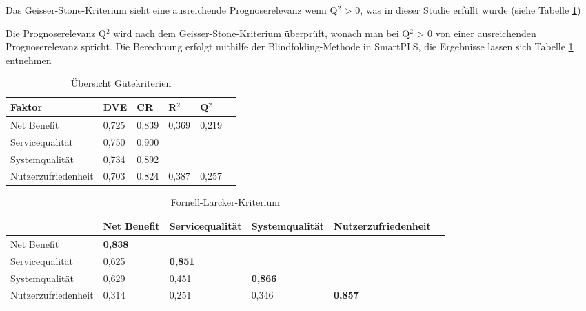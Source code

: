 Das Geisser-Stone-Kriterium sieht eine ausreichende Prognoserelevanz wenn Q$^2$ > 0, was in dieser Studie erfüllt wurde (siehe Tabelle \ref{tab:Übersicht Gütekriterien}) 

Die Prognoserelevanz Q$^2$ wird nach dem Geisser-Stone-Kriterium überprüft, wonach man bei Q$^2$ > 0 von einer ausreichenden Prognoserelevanz spricht. Die Berechnung erfolgt mithilfe der Blindfolding-Methode in SmartPLS, die Ergebnisse lassen sich Tabelle \ref{tab:Übersicht Gütekriterien} entnehmen
 





\begin{table}[h] 
\footnotesize
\caption{Übersicht Gütekriterien}
\label{tab:Übersicht Gütekriterien} 
\begin{tabular}{@{}llllll@{}} \toprule

\textbf{Faktor} & \textbf{DVE} & \textbf{CR} & \textbf{R$^2$} & \textbf{Q$^2$} \\ \midrule

 Net Benefit 		& 0,725 		& 0,839 & 0,369 & 0,219 		 \\
 
 Servicequalität 	& 0,750 		& 0,900 & 		& 			 \\

 Systemqualität 	& 0,734 		& 0,892 & 		& 			 \\

 Nutzerzufriedenheit & 0,703 	& 0,824 	& 0,387 	& 0,257		 \\ \bottomrule
\end{tabular}	
\end{table}



\begin{table}[h] 
\footnotesize
\caption{Fornell-Larcker-Kriterium}
\label{tab:Fornell-Larcker-Kriterium} 
\begin{tabular}{@{}llllll@{}} \toprule

 & \textbf{Net Benefit} & \textbf{Servicequalität} & \textbf{Systemqualität} & \textbf{Nutzerzufriedenheit} \\ \midrule

 Net Benefit 		& \textbf{0,838}		& 			& 		&  		\\
 
 Servicequalität 	& 0,625 		& \textbf{0,851}		& 		& 			\\

 Systemqualität 	& 0,629 		& 0,451 		& \textbf{0,866}	& 			 \\

 Nutzerzufriedenheit & 0,314 	& 0,251 		& 0,346 	& \textbf{0,857}	 \\ 
 
 \bottomrule
\end{tabular}	
\end{table}


